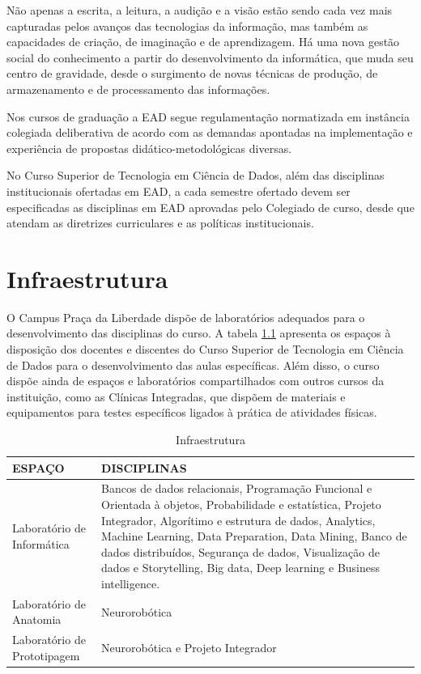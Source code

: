 \documentclass[a4paper, 12pt, openright, oneside, german, french, english, brazil]{abntex2}
\begin{document}
Não apenas a escrita, a leitura, a audição e a visão estão sendo cada vez mais capturadas pelos avanços das tecnologias da informação, mas também as capacidades de criação, de imaginação e de aprendizagem. Há uma nova gestão social do conhecimento a partir do desenvolvimento da informática, que muda seu centro de gravidade, desde o surgimento de novas técnicas de produção, de armazenamento e de processamento das informações.

Nos cursos de graduação a EAD segue regulamentação normatizada em instância colegiada deliberativa de acordo com as demandas apontadas na implementação e experiência de propostas didático-metodológicas diversas.

No Curso Superior de Tecnologia em Ciência de Dados, além das disciplinas institucionais ofertadas em EAD, a cada semestre ofertado devem ser especificadas as disciplinas em EAD aprovadas pelo Colegiado de curso, desde que atendam as diretrizes curriculares e as políticas institucionais.

\chapter{Infraestrutura}

O Campus Praça da Liberdade dispõe de laboratórios adequados para o desenvolvimento das disciplinas do curso. A tabela \ref{infra} apresenta os espaços à disposição dos docentes e discentes do Curso Superior de Tecnologia em Ciência de Dados para o desenvolvimento das aulas específicas. Além disso, o curso dispõe ainda de espaços e laboratórios compartilhados com outros cursos da instituição, como as Clínicas Integradas, que dispõem de materiais e equipamentos para testes específicos ligados à prática de atividades físicas.

\begin{table}[!h]
  \centering
  \footnotesize
  \caption{Infraestrutura}
  \label{infra}
  \begin{tabular}{|l|p{10cm}|}
    \hline
    ESPAÇO & DISCIPLINAS \\
    \hline
    Laboratório de Informática & Bancos de dados relacionais, Programação Funcional e Orientada à objetos, Probabilidade e estatística, Projeto Integrador, Algorítimo e estrutura de dados, Analytics, Machine Learning, Data Preparation, Data Mining, Banco de dados distribuídos, Segurança de dados, Visualização de dados e Storytelling, Big data, Deep learning e Business intelligence. \\
    \hline
    Laboratório de Anatomia & Neurorobótica \\
    \hline
    Laboratório de Prototipagem & Neurorobótica e Projeto Integrador \\
    \hline
  \end{tabular}
\end{table}
\end{document}
